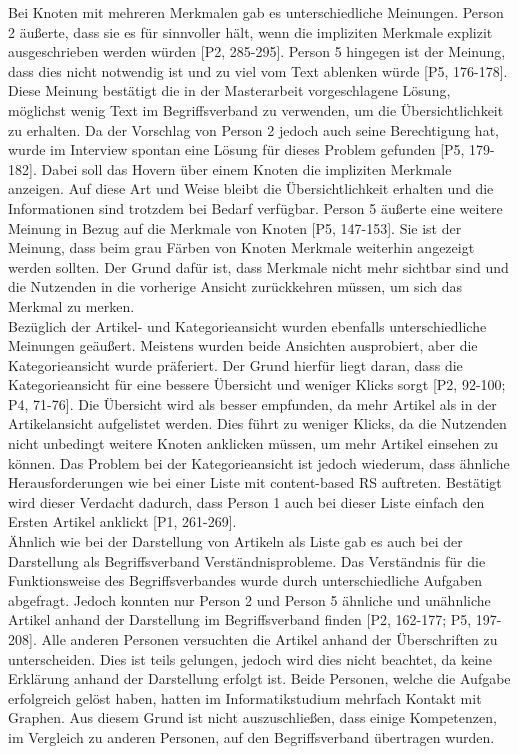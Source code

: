 Bei Knoten mit mehreren Merkmalen gab es unterschiedliche Meinungen.
Person 2 äußerte, dass sie es für sinnvoller hält, wenn die impliziten Merkmale explizit ausgeschrieben werden würden [P2, 285-295].
Person 5 hingegen ist der Meinung, dass dies nicht notwendig ist und zu viel vom Text ablenken würde [P5, 176-178].
Diese Meinung bestätigt die in der Masterarbeit vorgeschlagene Lösung, möglichst wenig Text im Begriffsverband zu verwenden, um die Übersichtlichkeit zu erhalten.
Da der Vorschlag von Person 2 jedoch auch seine Berechtigung hat, wurde im Interview spontan eine Lösung für dieses Problem gefunden [P5, 179-182].
Dabei soll das Hovern über einem Knoten die impliziten Merkmale anzeigen.
Auf diese Art und Weise bleibt die Übersichtlichkeit erhalten und die Informationen sind trotzdem bei Bedarf verfügbar.
Person 5 äußerte eine weitere Meinung in Bezug auf die Merkmale von Knoten [P5, 147-153].
Sie ist der Meinung, dass beim grau Färben von Knoten Merkmale weiterhin angezeigt werden sollten.
Der Grund dafür ist, dass Merkmale nicht mehr sichtbar sind und die Nutzenden in die vorherige Ansicht zurückkehren müssen, um sich das Merkmal zu merken.\\

Bezüglich der Artikel- und Kategorieansicht wurden ebenfalls unterschiedliche Meinungen geäußert.
Meistens wurden beide Ansichten ausprobiert, aber die Kategorieansicht wurde präferiert.
Der Grund hierfür liegt daran, dass die Kategorieansicht für eine bessere Übersicht und weniger Klicks sorgt [P2, 92-100; P4, 71-76].
Die Übersicht wird als besser empfunden, da mehr Artikel als in der Artikelansicht aufgelistet werden.
Dies führt zu weniger Klicks, da die Nutzenden nicht unbedingt weitere Knoten anklicken müssen, um mehr Artikel einsehen zu können.
Das Problem bei der Kategorieansicht ist jedoch wiederum, dass ähnliche Herausforderungen wie bei einer Liste mit content-based \ac{RS} auftreten.
Bestätigt wird dieser Verdacht dadurch, dass Person 1 auch bei dieser Liste \glqq einfach den Ersten\grqq{} Artikel anklickt [P1, 261-269].\\

Ähnlich wie bei der Darstellung von Artikeln als Liste gab es auch bei der Darstellung als Begriffsverband Verständnisprobleme.
Das Verständnis für die Funktionsweise des Begriffsverbandes wurde durch unterschiedliche Aufgaben abgefragt.
Jedoch konnten nur Person 2 und Person 5 ähnliche und unähnliche Artikel anhand der Darstellung im Begriffsverband finden [P2, 162-177; P5, 197-208].
Alle anderen Personen versuchten die Artikel anhand der Überschriften zu unterscheiden.
Dies ist teils gelungen, jedoch wird dies nicht beachtet, da keine Erklärung anhand der Darstellung erfolgt ist.
Beide Personen, welche die Aufgabe erfolgreich gelöst haben, hatten im Informatikstudium mehrfach Kontakt mit Graphen.
Aus diesem Grund ist nicht auszuschließen, dass einige Kompetenzen, im Vergleich zu anderen Personen, auf den Begriffsverband übertragen wurden. \\

